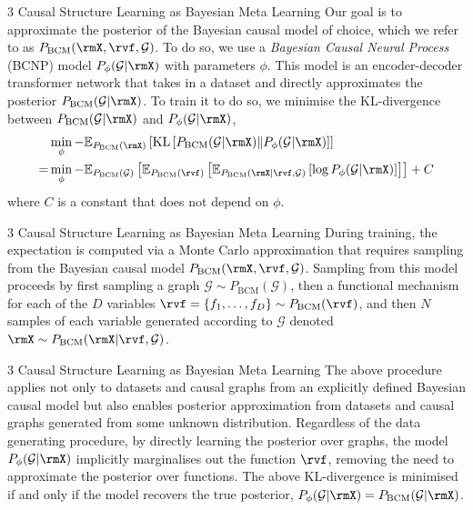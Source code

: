 \documentclass[aspectratio=169,10pt]{beamer}
\begin{document}
\begin{frame}{3 Causal Structure Learning as Bayesian Meta Learning}
\small
Our goal is to approximate the posterior of the Bayesian causal model of choice, which we refer to as $P_{\text{BCM}}(\rmX, \rvf, \mathcal{G})$. To do so, we use a \textit{Bayesian Causal Neural Process} (BCNP) model $P_{\phi}(\mathcal{G}| \rmX)$ with parameters $\phi$. This model is an encoder-decoder transformer network that takes in a dataset and directly approximates the posterior $P_{\text{BCM}}(\mathcal{G} | \rmX)$. To train it to do so, we minimise the KL-divergence between $P_{\text{BCM}}(\mathcal{G} | \rmX)$ and $P_{\phi}(\mathcal{G}| \rmX)$,
\begin{align*}
&\min_{\phi} -  \mathbb{E}_{P_{\text{BCM}}(\rmX)}\left[\operatorname{KL}\left[P_{\text{BCM}}(\mathcal{G} | \rmX) \|  P_{\phi}(\mathcal{G}| \rmX) \right]\right]   \\
    =& \min_{\phi}-  \mathbb{E}_{P_{\text{BCM}}(\mathcal{G})} \left[ \mathbb{E}_{P_{\text{BCM}}(\rvf)} \left[ \mathbb{E}_{P_{\text{BCM}}(\rmX | \rvf, \mathcal{G})}\left[  \log P_{\phi}(\mathcal{G}| \rmX)  \right] \right]  \right] + C
\end{align*}
where $C$ is a constant that does not depend on $\phi$.
\end{frame}

\begin{frame}{3 Causal Structure Learning as Bayesian Meta Learning}
\small
During training, the expectation is computed via a Monte Carlo approximation that requires sampling from the Bayesian causal model $P_{\text{BCM}}(\rmX, \rvf, \mathcal{G})$. Sampling from this model proceeds by first sampling a graph $\mathcal{G} \sim P_{\text{BCM}}(\mathcal{G})$, then a functional mechanism for each of the $D$ variables $\rvf = \{f_1, \ldots, f_D\} \sim P_{\text{BCM}}(\rvf)$, and then $N$ samples of each variable generated according to $\mathcal{G}$ denoted $\rmX \sim P_{\text{BCM}}(\rmX|\rvf, \mathcal{G})$.
\end{frame}

\begin{frame}{3 Causal Structure Learning as Bayesian Meta Learning}
\small
The above procedure applies not only to datasets and causal graphs from an explicitly defined Bayesian causal model but also enables posterior approximation from datasets and causal graphs generated from some unknown distribution. Regardless of the data generating procedure, by directly learning the posterior over graphs, the model $P_{\phi}(\mathcal{G}| \rmX)$ implicitly marginalises out the function $\rvf$, removing the need to approximate the posterior over functions. The above KL-divergence is minimised if and only if the model recovers the true posterior, $P_{\phi}(\mathcal{G}| \rmX) = P_{\text{BCM}}(\mathcal{G} | \rmX)$.
\end{frame}
\end{document}
